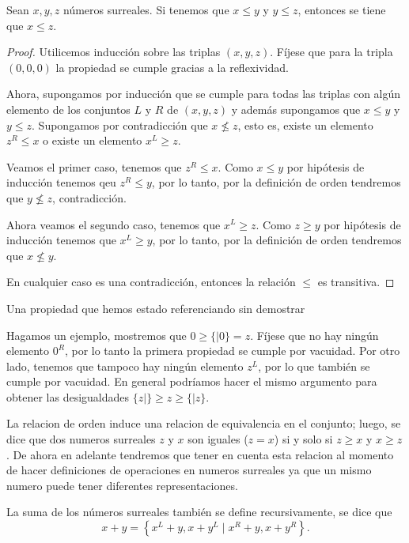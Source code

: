     \begin{theorem}[Transitividad]
        Sean $x,y,z$ n\'umeros surreales. Si tenemos que $x\le y$ y $y\le z$, entonces se tiene que $x\le z$.
    \end{theorem}

    \begin{proof}
        Utilicemos inducci\'on sobre las triplas $(x,y,z)$. F\'ijese que para la tripla $(0,0,0)$ la propiedad se cumple gracias a la reflexividad.

        Ahora, supongamos por inducci\'on que se cumple para todas las triplas con alg\'un elemento de los conjuntos $L$ y $R$ de $(x,y,z)$ y adem\'as supongamos que $x\le y$ y $y\le z$. Supongamos por contradicci\'on que $x\not\le z$, esto es, existe un elemento $z^R \le x$ o existe un elemento $x^L \ge z$.

        Veamos el primer caso, tenemos que $z^R \le x$. Como $x \le y$ por hip\'otesis de inducci\'on tenemos qeu $z^R \le y$, por lo tanto, por la definici\'on de orden tendremos que $y \not\le z$, contradicci\'on.

        Ahora veamos el segundo caso, tenemos que $x^L \ge z$. Como $z \ge y$ por hip\'otesis de inducci\'on tenemos que $x^L \ge y$, por lo tanto, por la definici\'on de orden tendremos que $x\not\le y$.

        En cualquier caso es una contradicci\'on, entonces la relaci\'on $\le$ es transitiva.
    \end{proof}

    Una propiedad que hemos estado referenciando sin demostrar 

    Hagamos un ejemplo, mostremos que $0\ge\{|0\}=z$. Fíjese que no hay ningún elemento $0^R$, por lo tanto la primera propiedad se cumple por vacuidad. Por otro lado, tenemos que tampoco hay ningún elemento $z^L$, por lo que también se cumple por vacuidad. En general podríamos hacer el mismo argumento para obtener las desigualdades $\{z|\}\ge z\ge\{|z\}$.

    La relacion de orden induce una relacion de equivalencia en el conjunto; luego, se dice que dos numeros surreales $z$ y $x$ son iguales ($z=x$) si y solo si $z\ge x$ y $x\ge z$. De ahora en adelante tendremos que tener en cuenta esta relacion al momento de hacer definiciones de operaciones en numeros surreales ya que un mismo numero puede tener diferentes representaciones.

    La suma de los números surreales también se define recursivamente, se dice que
    \[
        x + y  = \left\{x^L+y, x+y^L\;|\;x^R+y, x+y^R\right\}.
    \]

